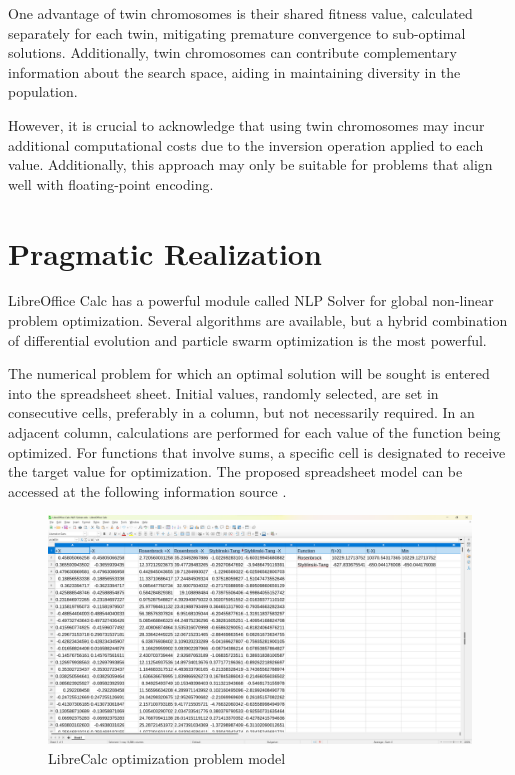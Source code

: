 \documentclass[runningheads]{llncs}
\begin{document}
One advantage of twin chromosomes is their shared fitness value, calculated separately for each twin, mitigating premature convergence to sub-optimal solutions. Additionally, twin chromosomes can contribute complementary information about the search space, aiding in maintaining diversity in the population.

However, it is crucial to acknowledge that using twin chromosomes may incur additional computational costs due to the inversion operation applied to each value. Additionally, this approach may only be suitable for problems that align well with floating-point encoding.

\section{Pragmatic Realization}

LibreOffice Calc has a powerful module called NLP Solver for global non-linear problem optimization. Several algorithms are available, but a hybrid combination of differential evolution and particle swarm optimization is the most powerful.

The numerical problem for which an optimal solution will be sought is entered into the spreadsheet sheet. Initial values, randomly selected, are set in consecutive cells, preferably in a column, but not necessarily required. In an adjacent column, calculations are performed for each value of the function being optimized. For functions that involve sums, a specific cell is designated to receive the target value for optimization. The proposed spreadsheet model can be accessed at the following information source \cite{Balabanov-2024}.

\begin{figure}
\includegraphics[width=\textwidth]{fig1.png}
\caption{LibreCalc optimization problem model} \label{fig1}
\end{figure}
\end{document}
